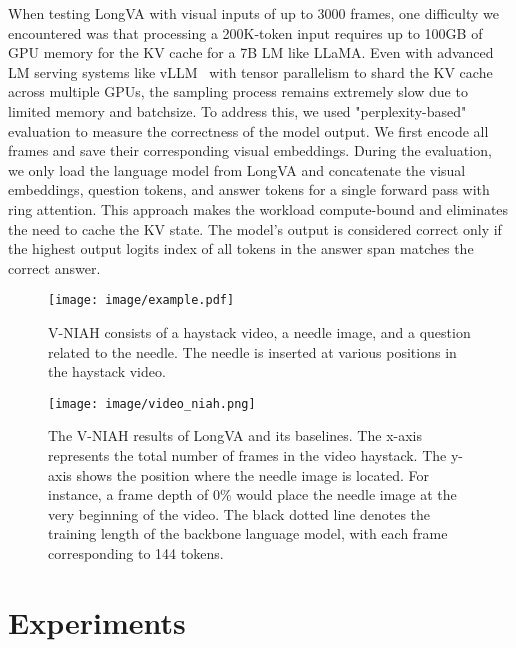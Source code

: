 When testing LongVA with visual inputs of up to 3000 frames, one difficulty we encountered was that processing a 200K-token input requires up to 100GB of GPU memory for the KV cache for a 7B LM like LLaMA. Even with advanced LM serving systems like vLLM~\citep{kwon2023efficient} with tensor parallelism to shard the KV cache across multiple GPUs, the sampling process remains extremely slow due to limited memory and batchsize. To address this, we used "perplexity-based" evaluation to measure the correctness of the model output. We first encode all frames and save their corresponding visual embeddings. During the evaluation, we only load the language model from LongVA and concatenate the visual embeddings, question tokens, and answer tokens for a single forward pass with ring attention. This approach makes the workload compute-bound and eliminates the need to cache the KV state. The model's output is considered correct only if the highest output logits index of all tokens in the answer span matches the correct answer.

\begin{figure}[t]
\label{fig:insert_niah}
    \centering
    \texttt{[image: image/example.pdf]}
    \caption{V-NIAH consists of a haystack video, a needle image, and a question related to the needle. The needle is inserted at various positions in the haystack video.}
\end{figure}

\begin{figure}[t]
    \centering
    \texttt{[image: image/video\_niah.png]}
    \caption{The V-NIAH results of LongVA and its baselines. The x-axis represents the total number of frames in the video haystack. The y-axis shows the position where the needle image is located. For instance, a frame depth of 0\% would place the needle image at the very beginning of the video. The black dotted line denotes the training length of the backbone language model, with each frame corresponding to 144 tokens.}
    \label{fig:vniah_plot}
\end{figure}

\section{Experiments}
\label{sec:experiments}

